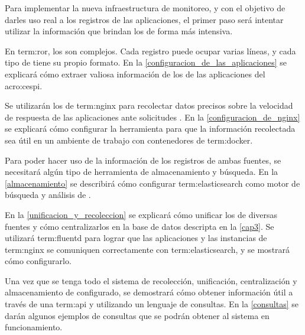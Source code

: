 Para implementar la nueva infraestructura de monitoreo, y con el objetivo de
darles uso real a los registros de las aplicaciones, el primer paso será
intentar utilizar la información que brindan los  de forma más
intensiva.

En \gls{term:ror}, los  son complejos. Cada registro puede ocupar
varias líneas, y cada tipo de  tiene su propio formato. En la
\autoref{configuracion_de_las_aplicaciones} se explicará cómo extraer valiosa
información de los  de las aplicaciones del \gls{acro:cespi}.

Se utilizarán los  de \gls{term:nginx} para recolectar datos precisos
sobre la velocidad de respuesta de las aplicaciones ante solicitudes .
En la \autoref{configuracion_de_nginx} se explicará cómo configurar la
herramienta para que la información recolectada sea útil en un ambiente de
trabajo con contenedores de \gls{term:docker}.

Para poder hacer uso de la información de los registros de ambas fuentes,
se necesitará algún tipo de herramienta de almacenamiento y búsqueda. En la
\autoref{almacenamiento} se describirá cómo configurar \gls{term:elasticsearch}
como motor de búsqueda y análisis de .

En la \autoref{unificacion_y_recoleccion} se explicará cómo unificar los
 de diversas fuentes y cómo centralizarlos en la base de datos
descripta en la \autoref{cap3}. Se utilizará \gls{term:fluentd} para lograr
que las aplicaciones y las instancias de \gls{term:nginx} se comuniquen
correctamente con \gls{term:elasticsearch}, y se mostrará cómo configurarlo.

Una vez que se tenga todo el sistema de recolección, unificación,
centralización y almacenamiento de  configurado, se demostrará cómo
obtener información útil a través de una \gls{term:api} y utilizando un
lenguaje de consultas. En la \autoref{consultas} se darán algunos ejemplos de
consultas que se podrán obtener al sistema en funcionamiento.
